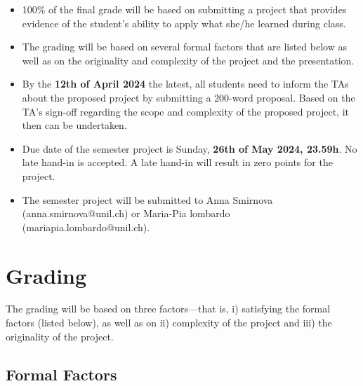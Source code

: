 \documentclass[12pt]{article} %
\begin{document}
\begin{itemize}

 \item 100\% of the final grade will be based on submitting a project that 
provides evidence of the student's ability to apply what she/he learned 
during class.

\item The grading will be based on several formal factors that are listed 
below as well as on the originality and complexity of the project and the presentation.


\item By the {\bf{12th of April 2024}} the latest, all students need to inform the TAs about
the proposed project by submitting a 200-word proposal. Based on the TA's sign-off regarding the scope and complexity
of the proposed project, it then can be undertaken.

\item Due date of the semester project is Sunday, {\bf{26th of May 2024, 23.59h}}.
No late hand-in is accepted.
A late hand-in will result in zero points for the project.

\item The semester project will be submitted to Anna Smirnova (anna.smirnova@unil.ch) or Maria-Pia lombardo (mariapia.lombardo@unil.ch).


\end{itemize}









\section{Grading}



The grading will be based on three factors---that is, 
i) satisfying the formal factors (listed below), as well as on ii) complexity of 
the project and iii) the originality of the project.


\subsection{Formal Factors}
\end{document}
